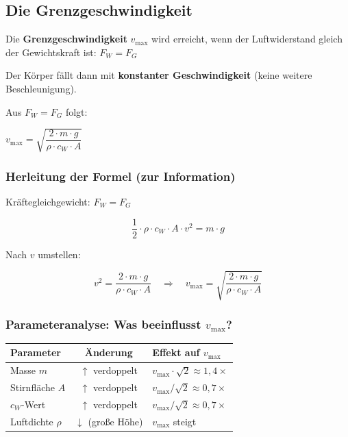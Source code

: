 \documentclass[11pt, a4paper]{article}
\newcommand{\wichtig}[1]{\textcolor{physik}{\textbf{#1}}}
\begin{document}
\subsection{Die Grenzgeschwindigkeit}

\begin{merksatz}
Die \wichtig{Grenzgeschwindigkeit} $v_{\text{max}}$ wird erreicht, wenn der Luftwiderstand gleich der Gewichtskraft ist: $F_W = F_G$

Der Körper fällt dann mit \textbf{konstanter Geschwindigkeit} (keine weitere Beschleunigung).
\end{merksatz}

\begin{formelbox}[title=Grenzgeschwindigkeit]
Aus $F_W = F_G$ folgt:
\begin{center}
{\Large $v_{\text{max}} = \sqrt{\dfrac{2 \cdot m \cdot g}{\rho \cdot c_W \cdot A}}$}
\end{center}
\end{formelbox}

\subsubsection*{Herleitung der Formel (zur Information)}

Kräftegleichgewicht: $F_W = F_G$

$$\dfrac{1}{2} \cdot \rho \cdot c_W \cdot A \cdot v^2 = m \cdot g$$

Nach $v$ umstellen:

$$v^2 = \dfrac{2 \cdot m \cdot g}{\rho \cdot c_W \cdot A} \quad \Rightarrow \quad v_{\text{max}} = \sqrt{\dfrac{2 \cdot m \cdot g}{\rho \cdot c_W \cdot A}}$$

\subsubsection*{Parameteranalyse: Was beeinflusst $v_{\text{max}}$?}

\begin{center}
\begin{tabular}{|l|c|l|}
\hline
\textbf{Parameter} & \textbf{Änderung} & \textbf{Effekt auf $v_{\text{max}}$} \\
\hline
Masse $m$ & $\uparrow$ verdoppelt & $v_{\text{max}} \cdot \sqrt{2} \approx 1,4 \times$ \\
\hline
Stirnfläche $A$ & $\uparrow$ verdoppelt & $v_{\text{max}} / \sqrt{2} \approx 0,7 \times$ \\
\hline
$c_W$-Wert & $\uparrow$ verdoppelt & $v_{\text{max}} / \sqrt{2} \approx 0,7 \times$ \\
\hline
Luftdichte $\rho$ & $\downarrow$ (große Höhe) & $v_{\text{max}}$ steigt \\
\hline
\end{tabular}
\end{center}
\end{document}
